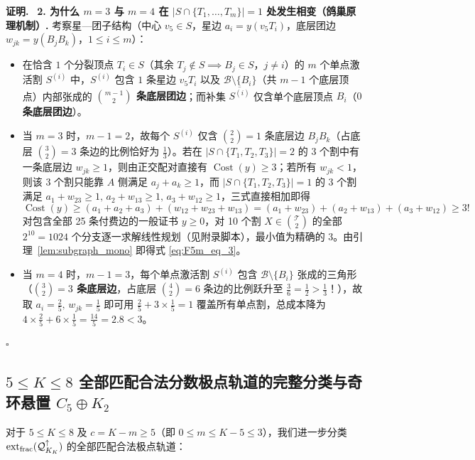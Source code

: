 \documentclass[11pt,a4paper]{ctexart}
\theoremstyle{definition}
\newenvironment{proofcn}{\par\noindent\textbf{证明.}\ }{\hfill$\square$\par}
\newcommand{\1}{\boldsymbol 1}
\newcommand{\0}{\boldsymbol 0}
\begin{document}
\begin{proofcn}
\medskip
\noindent\textbf{2. 为什么 $m=3$ 与 $m=4$ 在 $|S\cap\{T_1,\dots,T_m\}|=1$ 处发生相变（鸽巢原理机制）.}
考察星—团子结构（中心 $v_5\in S$，星边 $a_i=y(v_5T_i)$，底层团边 $w_{jk}=y(B_jB_k)$，$1\le i\le m$）：
\begin{itemize}
\item 在恰含 $1$ 个分裂顶点 $T_i\in S$（其余 $T_j\notin S\implies B_j\in S$，$j\neq i$）的 $m$ 个单点激活割 $S^{(i)}$ 中，$S^{(i)}$ 包含 $1$ 条星边 $v_5T_i$ 以及 $\mathcal B\setminus\{B_i\}$（共 $m-1$ 个底层顶点）内部张成的 \textbf{$\binom{m-1}{2}$ 条底层团边}；而补集 $\overline{S^{(i)}}$ 仅含单个底层顶点 $B_i$（\textbf{$0$ 条底层团边}）。
\item 当 \textbf{$m=3$} 时，$m-1=2$，故每个 $S^{(i)}$ 仅含 $\binom{2}{2}=1$ 条底层边 $B_jB_k$（占底层 $\binom{3}{2}=3$ 条边的比例恰好为 $\frac{1}{3}$）。若在 $|S\cap\{T_1,T_2,T_3\}|=2$ 的 3 个割中有一条底层边 $w_{jk}\ge 1$，则由正交配对直接有 $\operatorname{Cost}(y)\ge 3$；若所有 $w_{jk}<1$，则该 3 个割只能靠 $A$ 侧满足 $a_j+a_k\ge 1$，而 $|S\cap\{T_1,T_2,T_3\}|=1$ 的 3 个割满足 $a_1+w_{23}\ge 1,\,a_2+w_{13}\ge 1,\,a_3+w_{12}\ge 1$，三式直接相加即得
\[
 \operatorname{Cost}(y) \ge (a_1+a_2+a_3) + (w_{12}+w_{23}+w_{13}) = (a_1+w_{23}) + (a_2+w_{13}) + (a_3+w_{12}) \ge 3!
\]
对包含全部 25 条付费边的一般证书 $y\ge 0$，对 10 个割 $X\in\binom{\mathcal T}{2}$ 的全部 $2^{10}=1024$ 个分支逐一求解线性规划（见附录脚本），最小值为精确的 $3$。由引理~\ref{lem:subgraph_mono} 即得式 \eqref{eq:F5m_eq_3}。
\item 当 \textbf{$m=4$} 时，$m-1=3$，每个单点激活割 $S^{(i)}$ 包含 $\mathcal B\setminus\{B_i\}$ 张成的三角形（\textbf{$\binom{3}{2}=3$ 条底层边}，占底层 $\binom{4}{2}=6$ 条边的比例跃升至 $\frac{3}{6}=\frac{1}{2}>\frac{1}{3}$！），故取 $a_i=\frac{2}{5},\,w_{jk}=\frac{1}{5}$ 即可用 $\frac{2}{5}+3\times\frac{1}{5}=1$ 覆盖所有单点割，总成本降为 $4\times\frac{2}{5}+6\times\frac{1}{5}=\frac{14}{5}=2.8<3$。
\end{itemize}
\end{proofcn}

\subsection{$5\le K\le 8$ 全部匹配合法分数极点轨道的完整分类与奇环悬置 $C_5\oplus K_2$}
对于 $5\le K\le 8$ 及 $c=K-m\ge 5$（即 $0\le m\le K-5\le 3$），我们进一步分类 $\operatorname{ext}_{\rm frac}(\mathcal Q_{K_K}^{\uparrow})$ 的全部匹配合法极点轨道：
\end{document}
